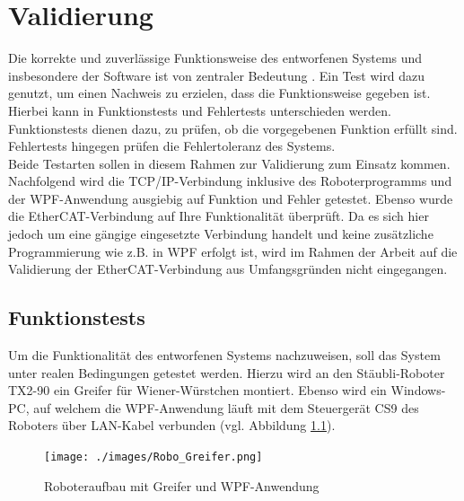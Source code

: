 \documentclass[ a4paper,
                oneside,
                toc=bibliography,
                toc=listof
                ]{scrbook}
\begin{document}
   	\chapter{Validierung}
   	\label{chap:Validierung}
   	
   	Die korrekte und zuverlässige Funktionsweise des entworfenen Systems und insbesondere der Software ist von zentraler Bedeutung \cite{liggesmeyer2009software}.
   	Ein Test wird dazu genutzt, um einen Nachweis zu erzielen, dass die Funktionsweise gegeben ist. Hierbei kann in Funktionstests und Fehlertests unterschieden werden. Funktionstests dienen dazu, zu prüfen, ob die vorgegebenen Funktion erfüllt sind. Fehlertests hingegen prüfen die Fehlertoleranz des Systems. \cite{ISWLeitfaden} \cite{Sommerville} \\
   	Beide Testarten sollen in diesem Rahmen zur Validierung zum Einsatz kommen. Nachfolgend wird die TCP/IP-Verbindung inklusive des Roboterprogramms und der WPF-Anwendung ausgiebig auf Funktion und Fehler getestet. Ebenso wurde die EtherCAT-Verbindung auf Ihre Funktionalität überprüft. Da es sich hier jedoch um eine gängige eingesetzte Verbindung handelt und keine zusätzliche Programmierung wie z.B. in WPF erfolgt ist, wird im Rahmen der Arbeit auf die Validierung der EtherCAT-Verbindung aus Umfangsgründen nicht eingegangen.
   	\section{Funktionstests}
   	Um die Funktionalität des entworfenen Systems nachzuweisen, soll das System unter realen Bedingungen getestet werden. Hierzu wird an den Stäubli-Roboter TX2-90 ein Greifer für Wiener-Würstchen montiert. Ebenso wird ein Windows-PC, auf welchem die WPF-Anwendung läuft mit dem Steuergerät CS9 des Roboters über LAN-Kabel verbunden (vgl. Abbildung \ref{fig:Robo}).
   	\begin{figure}[!ht]
   		\centering
   		\texttt{[image: ./images/Robo\_Greifer.png]}
   		\caption{Roboteraufbau mit Greifer und WPF-Anwendung}
   		\label{fig:Robo}
   	\end{figure}\\
   	
\end{document}
